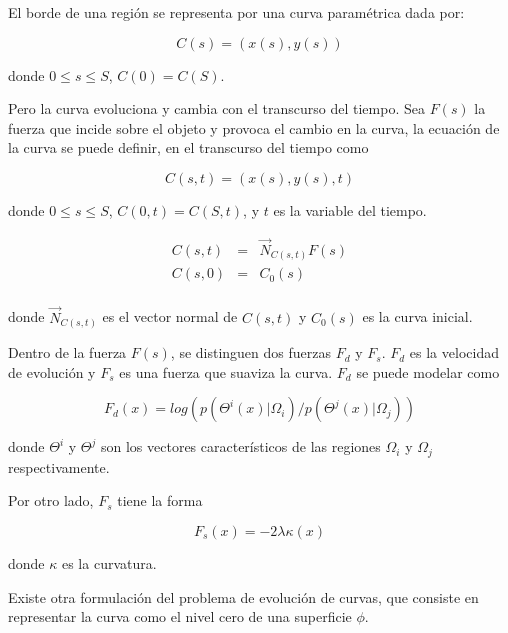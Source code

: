 \documentclass[a4paper,10pt]{article}
\begin{document}
El borde de una región se representa por una curva paramétrica dada por:

\begin{equation}
    C(s) = (x(s), y(s))
\end{equation}

donde $0 \leq s \leq S$, $C(0) = C(S)$.

Pero la curva evoluciona y cambia con el transcurso del tiempo. Sea $F(s)$ la fuerza que incide sobre el objeto y provoca el cambio en la curva, la ecuación
de la curva se puede definir, en el transcurso del tiempo como


\begin{equation}
    C(s,t) = (x(s), y(s), t)
\end{equation}

donde $0 \leq s \leq S$, $C(0,t) = C(S,t)$, y $t$ es la variable del tiempo.

\begin{eqnarray}
    C(s,t) &=& \overrightarrow{N}_{C(s,t)}F(s)\\
    C(s,0) &=& C_{0}(s)\\
\end{eqnarray}

donde $\overrightarrow{N}_{C(s,t)}$ es el vector normal de $C(s,t)$ y $ C_{0}(s)$ es la curva inicial.

Dentro de la fuerza $F(s)$, se distinguen dos fuerzas $F_{d}$ y $F_{s}$. $F_{d}$ es la velocidad de evolución y $F_{s}$ es una fuerza que suaviza la curva.
$F_{d}$ se puede modelar como 

\begin{equation}
    F_{d}(x) = log(p(\Theta^{i}(x) | \Omega_{i}) / p(\Theta^{j}(x) | \Omega_{j}))
\end{equation}

donde $\Theta^{i}$ y $\Theta^{j}$ son los vectores característicos de las regiones $\Omega_{i}$ y $\Omega_{j}$ respectivamente.

Por otro lado, $F_{s}$ tiene la forma

\begin{equation}
    \label{eq:active-contours-fs}
    F_{s}(x) = -2\lambda\kappa(x)
\end{equation}

donde $\kappa$ es la curvatura.

Existe otra formulación del problema de evolución de curvas, que consiste en representar la curva como el nivel cero de
una superficie $\phi$.

\end{document}
